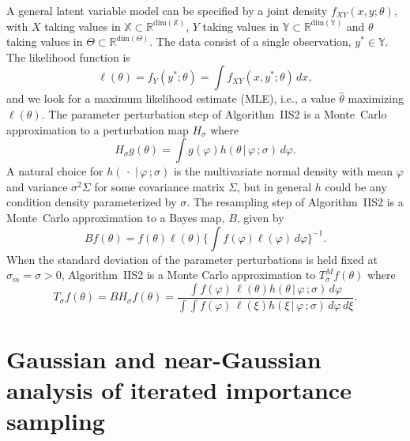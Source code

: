 \documentclass[11pt]{article}
\newcommand{\bbTheta}{\Theta}
\newcommand\IIS{IIS2}
\newcommand\fzero{f}
\newcommand\mytheta{\theta}
\def\R{\mathbb{R}}
\newcommand\lik{\ell}
\newcommand\Xspace{{\mathbb X}}
\newcommand\Yspace{{\mathbb Y}}
\newcommand\Thetaspace{{\bbTheta}}
\newcommand\Xdim{{\mathrm{dim}}(\Xspace)}
\newcommand\Ydim{{\mathrm{dim}}(\Yspace)}
\newcommand\Thetadim{{\mathrm{dim}}(\Thetaspace)}
\newcommand\given{{\, | \,}}
\newcommand\giventh{\,;}
\begin{document}
A general latent variable model can be specified by a joint density $f_{XY}(x,y;\theta)$, with $X$ taking values in $\Xspace\subset \R^{\Xdim}$, $Y$ taking values in $\Yspace\subset \R^{\Ydim}$ and $\theta$ taking values in $\Thetaspace\subset\R^{\Thetadim}$. 
The data consist of a single observation, $y^*\in \Yspace$. 
The likelihood function is
\begin{equation}\nonumber
\lik(\theta)=f_Y(y^*;\theta)=\int f_{XY}(x,y^*;\theta)\, dx,
\end{equation}
and we look for a maximum likelihood estimate (MLE), i.e., a value $\hat\theta$ maximizing $\lik(\theta)$.
The parameter perturbation step of Algorithm~{\IIS} is a Monte~Carlo approximation to a perturbation map $H_{\sigma}$ where
\begin{equation}\label{eq:perturb_map}
H_\sigma g(\mytheta)=\int g(\varphi)h(\theta\given\varphi\giventh\sigma)\, d\varphi.
\end{equation}
A natural choice for $h(\,\cdot\,\given\varphi\giventh\sigma)$ is the multivariate normal density with mean $\varphi$ and variance $\sigma^2\Sigma$ for some covariance matrix $\Sigma$, but in general $h$ could be any condition density parameterized by $\sigma$.
The resampling step of Algorithm~{\IIS} is a Monte~Carlo approximation to a Bayes map, $B$, given by
\begin{equation}\label{eq:bayes_map}
Bf(\mytheta)=f(\mytheta)\lik(\mytheta)\Big\{\int f(\varphi)\lik(\varphi)\, d\varphi\Big\}^{-1}.
\end{equation}
When the standard deviation of the parameter perturbations is held fixed at $\sigma_m=\sigma>0$, Algorithm~{\IIS} is a Monte Carlo approximation to $T_\sigma^M\fzero(\theta)$ where
\begin{equation}
\label{recursion}
T_\sigma f(\mytheta) =  BH_\sigma f(\mytheta)= \frac{\int f(\varphi)\, \lik(\theta) h(\theta\given\varphi\giventh\sigma)\, d\varphi}{\int \!\! \int f(\varphi)\, \lik(\xi) h(\xi\given\varphi\giventh\sigma)\, d\varphi \, d\xi}.
\end{equation}

\section{Gaussian and near-Gaussian analysis of iterated importance sampling}\label{sec:gaussian}
\end{document}
